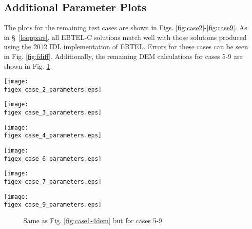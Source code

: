 \documentclass[preprint,10pt]{aastex}
\newcommand{\figex}{/Users/willbarnes/Documents/Rice/Research/EBTEL_figures/}
\begin{document}
\begin{appendix}
\section{Additional Parameter Plots}\label{addparplots}
The plots for the remaining test cases are shown in Figs. \ref{fig:case2}-\ref{fig:case9}. As in \S~\ref{looppars}, all EBTEL-C solutions match well with those solutions produced using the 2012 IDL implementation of EBTEL. Errors for these cases can be seen in Fig. \ref{fig:fdiff}. Additionally, the remaining DEM calculations for cases 5-9 are shown in Fig. \ref{fig:case5-9dem}.
%
\begin{sidewaysfigure}[p]
\centering
\texttt{[image: \\figex case\_2\_parameters.eps]}
\caption{Same as Fig. \ref{fig:case1} but for Case 2.}
\label{fig:case2}
\end{sidewaysfigure}
%
\begin{sidewaysfigure}[p]
\centering
\texttt{[image: \\figex case\_3\_parameters.eps]}
\caption{Same as Fig. \ref{fig:case1} but for Case 3.}
\label{fig:case3}
\end{sidewaysfigure}
%
\begin{sidewaysfigure}[p]
\centering
\texttt{[image: \\figex case\_4\_parameters.eps]}
\caption{Same as Fig. \ref{fig:case1} but for Case 4.}
\label{fig:case4}
\end{sidewaysfigure}
%
\begin{sidewaysfigure}[p]
\centering
\texttt{[image: \\figex case\_6\_parameters.eps]}
\caption{Same as Fig. \ref{fig:case1} but for Case 6.}
\label{fig:case6}
\end{sidewaysfigure}
%
\begin{sidewaysfigure}[p]
\centering
\texttt{[image: \\figex case\_7\_parameters.eps]}
\caption{Same as Fig. \ref{fig:case1} but for Case 7.}
\label{fig:case7}
\end{sidewaysfigure}
%
\begin{sidewaysfigure}[p]
\centering
\texttt{[image: \\figex case\_9\_parameters.eps]}
\caption{Same as Fig. \ref{fig:case1} but for Case 9.}
\label{fig:case9}
\end{sidewaysfigure}
%
\begin{figure}
\centering
{}
\caption{Same as Fig. \ref{fig:case1-4dem} but for cases 5-9.}
\label{fig:case5-9dem}
\end{figure}
%

\end{appendix}
\end{document}
